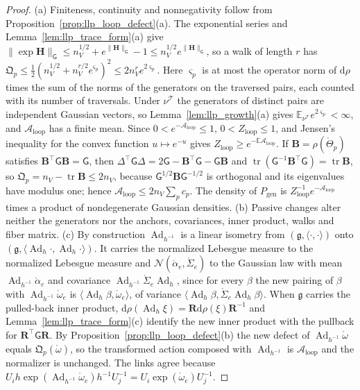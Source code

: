 \begin{proof}
(a) Finiteness, continuity and nonnegativity follow from Proposition~\ref{prop:llp_loop_defect}(a). The exponential series and Lemma~\ref{lem:llp_trace_form}(a) give $\|\exp\mathbf H\|_{\mathsf G}\leq n_V^{1/2}+e^{\|\mathbf H\|_{\mathsf G}}-1\leq n_V^{1/2}e^{\|\mathbf H\|_{\mathsf G}}$, so a walk of length $r$ has $\mathfrak Q_p\leq\frac12(n_V^{1/2}+n_V^{r/2}e^{\varsigma_p})^2\leq2n_V^re^{2\varsigma_p}$. Here $\varsigma_p$ is at most the operator norm of $\mathrm d\rho$ times the sum of the norms of the generators on the traversed pairs, each counted with its number of traversals. Under $\nu^{\mathcal T}$ the generators of distinct pairs are independent Gaussian vectors, so Lemma~\ref{lem:llp_growth}(a) gives $\mathbb E_{\nu^{\mathcal T}}e^{2\varsigma_p}<\infty$, and $\mathcal A_{\mathrm{loop}}$ has a finite mean. Since $0<e^{-\mathcal A_{\mathrm{loop}}}\leq1$, $0<Z_{\mathrm{loop}}\leq1$, and Jensen's inequality for the convex function $u\mapsto e^{-u}$ gives $Z_{\mathrm{loop}}\geq e^{-\mathbb E\mathcal A_{\mathrm{loop}}}$. If $\mathbf B=\rho(\mathring\Theta_p)$ satisfies $\mathbf B^\top\mathsf G\mathbf B=\mathsf G$, then $\Delta^\top\mathsf G\Delta=2\mathsf G-\mathbf B^\top\mathsf G-\mathsf G\mathbf B$ and $\operatorname{tr}(\mathsf G^{-1}\mathbf B^\top\mathsf G)=\operatorname{tr}\mathbf B$, so $\mathfrak Q_p=n_V-\operatorname{tr}\mathbf B\leq2n_V$, because $\mathsf G^{1/2}\mathbf B\mathsf G^{-1/2}$ is orthogonal and its eigenvalues have modulus one; hence $\mathcal A_{\mathrm{loop}}\leq2n_V\sum_pc_p$. The density of $P_{\mathrm{gen}}$ is $Z_{\mathrm{loop}}^{-1}e^{-\mathcal A_{\mathrm{loop}}}$ times a product of nondegenerate Gaussian densities.
(b) Passive changes alter neither the generators nor the anchors, covariances, inner product, walks and fiber matrix.
(c) By construction $\operatorname{Ad}_{h^{-1}}$ is a linear isometry from $(\mathfrak g,\langle\cdot,\cdot\rangle)$ onto $(\mathfrak g,\langle\operatorname{Ad}_h\cdot,\operatorname{Ad}_h\cdot\rangle)$. It carries the normalized Lebesgue measure to the normalized Lebesgue measure and $\mathcal N(\mathring\alpha_e,\mathring\Sigma_e)$ to the Gaussian law with mean $\operatorname{Ad}_{h^{-1}}\mathring\alpha_e$ and covariance $\operatorname{Ad}_{h^{-1}}\mathring\Sigma_e\operatorname{Ad}_h$, since for every $\beta$ the new pairing of $\beta$ with $\operatorname{Ad}_{h^{-1}}\mathring\omega_e$ is $\langle\operatorname{Ad}_h\beta,\mathring\omega_e\rangle$, of variance $\langle\operatorname{Ad}_h\beta,\mathring\Sigma_e\operatorname{Ad}_h\beta\rangle$. When $\mathfrak g$ carries the pulled-back inner product, $\mathrm d\rho(\operatorname{Ad}_h\xi)=\mathbf R\mathrm d\rho(\xi)\mathbf R^{-1}$ and Lemma~\ref{lem:llp_trace_form}(c) identify the new inner product with the pullback for $\mathbf R^\top\mathsf G\mathbf R$. By Proposition~\ref{prop:llp_loop_defect}(b) the new defect of $\operatorname{Ad}_{h^{-1}}\mathring\omega$ equals $\mathfrak Q_p(\mathring\omega)$, so the transformed action composed with $\operatorname{Ad}_{h^{-1}}$ is $\mathcal A_{\mathrm{loop}}$ and the normalizer is unchanged. The links agree because $U_ih\exp(\operatorname{Ad}_{h^{-1}}\mathring\omega_e)h^{-1}U_j^{-1}=U_i\exp(\mathring\omega_e)U_j^{-1}$.

\end{proof}
